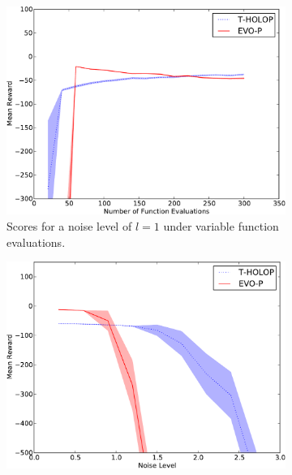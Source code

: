 \documentclass[conference]{IEEEtran}
\begin{document}


\begin{figure}[ht]



  \centering
        \begin{subfigure}[b]{0.32\textwidth}
                \centering
                \includegraphics[width=1.0\textwidth]{graphics/online-IP-crop.pdf}
                \caption{Scores for a noise level of $l=1$ under variable function evaluations. }
                \label{fig:IP}
        \end{subfigure}   \begin{subfigure}[b]{0.32\textwidth}
                \centering
                \includegraphics[width=1.0\textwidth]{graphics/online-noise-IP_50-crop.pdf}

\end{subfigure}
\end{figure}
\end{document}

